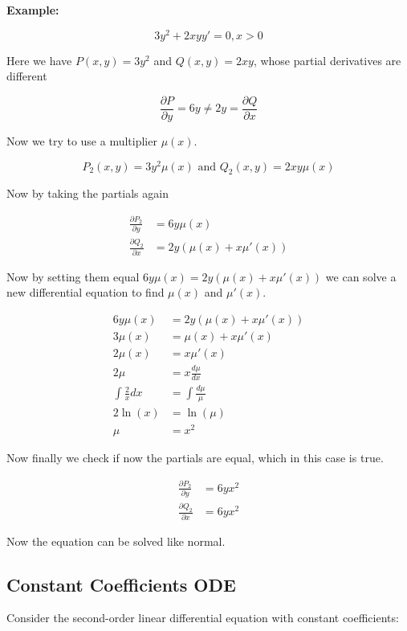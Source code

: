 \textbf{Example:}

\[
    3y^2 + 2xy y' = 0, x > 0 
\]

Here we have \(P(x,y) = 3y^2\) and \(Q(x,y) = 2xy\), whose partial derivatives are different

\[
    \frac{\partial P}{\partial y} = 6y \ne 2y = \frac{\partial Q}{\partial x}
\]

Now we try to use a multiplier \(\mu(x)\).

\[
    P_2 (x,y) = 3y^2 \mu(x) \text{ and } Q_2 (x,y)  = 2xy\mu(x)
\]

Now by taking the partials again

\begin{align*}
    \frac{\partial P_2}{\partial y} &= 6y\mu(x)\\  
    \frac{\partial Q_2}{\partial x} &= 2y(\mu(x) + x\mu'(x))  
\end{align*}

Now by setting them equal \(6y\mu(x) = 2y(\mu(x) + x\mu'(x))\) we can solve a new differential equation 
to find \(\mu(x)\) and \(\mu'(x)\).  

\begin{align*}
    6y\mu(x) &= 2y(\mu(x) + x\mu'(x)) \\
    3\mu(x) &= \mu(x) + x\mu'(x) \\
    2\mu(x) &= x\mu'(x)\\
    2\mu &= x \frac{d\mu}{dx} \\
    \int \frac{2}{x}dx &= \int \frac{d\mu}{\mu} \\
    2\ln(x) &= \ln(\mu) \\
    \mu &= x^2
\end{align*}

Now finally we check if now the partials are equal, which in this case is true.

\begin{align*}
    \frac{\partial P_2}{\partial y} &= 6yx^2\\  
    \frac{\partial Q_2}{\partial x} &= 6yx^2  
\end{align*}

Now the equation can be solved like normal.

\subsection{Constant Coefficients ODE}

Consider the second-order linear differential equation with constant coefficients:

